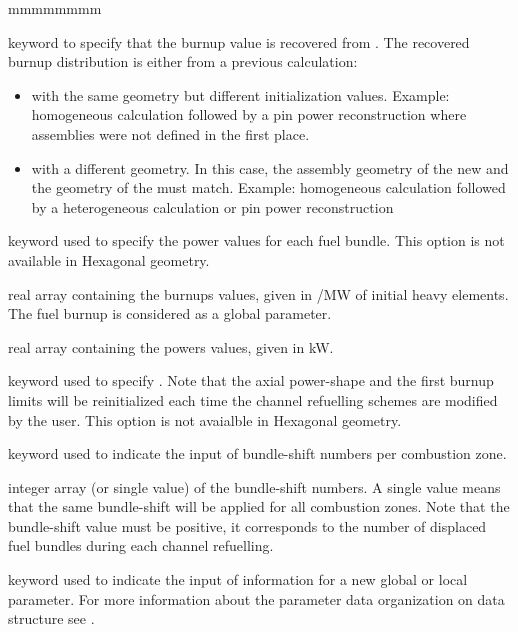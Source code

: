 \begin{ListeDeDescription}{mmmmmmmm}
\item[\moc{OLDMAP}] keyword to specify that the burnup value is recovered from . The recovered burnup distribution is either from a previous calculation: \begin{itemize}
\item  with the same geometry but different initialization values. Example: homogeneous calculation followed by a pin power reconstruction where assemblies were not defined in the first place.
\item with a different geometry. In this case, the assembly geometry of the new  and the geometry of the  must match. Example: homogeneous calculation followed by a heterogeneous calculation or pin power reconstruction
\end{itemize}

\item[\moc{BUNDLE-POW}] keyword used to specify the power values for each fuel bundle.
This option is not available in  Hexagonal geometry.

\item[\dusa{bvalue}] real array containing the burnups values, given in
/MW of initial heavy elements. The fuel burnup
is considered as a global parameter.

\item[\dusa{pwvalue}] real array containing the powers values, given in kW.

\item[\moc{REF-SHIFT}] keyword used to specify . Note that the
axial power-shape and the first burnup limits will be reinitialized each time the channel
refuelling schemes are modified by the user. This option is not avaialble in 
Hexagonal geometry.

\item[\moc{COMB}] keyword used to indicate the input of bundle-shift numbers
per combustion zone.

\item[\dusa{ishift}] integer array (or single value) of the bundle-shift numbers.
A single  value means that the same bundle-shift will be applied for
all combustion zones. Note that the bundle-shift value must be positive, it
corresponds to the number of displaced fuel bundles during each channel refuelling.

\item[\moc{ADD-PARAM}] keyword used to indicate the input of information
for a new global or local parameter. For more information about the parameter
data organization on  data structure see .


\end{ListeDeDescription}
